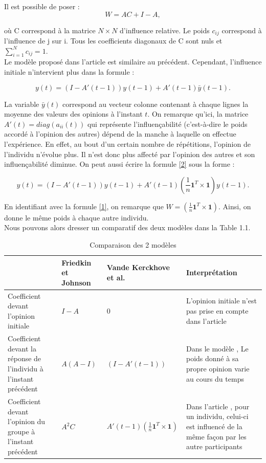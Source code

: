 \documentclass{scrreprt}
\begin{document}
 Il est possible de poser :\\
\begin{equation}
\label{WC}
 W=AC+I-A,
\end{equation}

\noindent où C correspond à la matrice $N \times N$ d'influence relative. Le poids $c_{ij}$ correspond à l'influence de j sur i. Tous les coefficients diagonaux de C sont nuls et $\sum_{i=1}^{N} c_{ij} = 1$. \\

Le modèle proposé dans l'article \cite{VMG} est similaire au précédent. Cependant, l’influence initiale n'intervient plus dans la formule :

\begin{equation}
\label{2}
y(t) =(I-A'(t-1))y(t-1)+A'(t-1)\bar{y}(t-1).
\end{equation}

La variable $\bar{y}(t)$ correspond au vecteur colonne contenant à chaque lignes la moyenne des valeurs des opinions à l'instant $t$. On remarque qu’ici, la matrice $A'(t) = diag(a_{ii}(t))$ qui représente l'influençabilité (c'est-à-dire le poids accordé à l'opinion des autres) dépend de la manche à laquelle on effectue l’expérience. En effet, au bout d'un certain nombre de répétitions, l'opinion de l'individu n'évolue plus. Il n'est donc plus affecté par l'opinion des autres et son influençabilité diminue. On peut aussi écrire la formule \eqref{2} sous la forme :

\begin{dmath}
\label{3}
y(t) = (I-A'(t-1))y(t-1) + A'(t-1)(\frac{1}{n} \textbf{1} ^T\times \textbf{1}) y(t-1).
\end{dmath}

En identifiant avec la formule \eqref{1}, on remarque que $W=(\frac{1}{n} \textbf{1} ^T\times \textbf{1})$. Ainsi, on donne le même poids à chaque autre individu.\\

Nous pouvons alors dresser un comparatif des deux modèles dans la Table 1.1.\\

  

\begin{table}
	\begin{tabular}{|p{3cm}|p{3.375cm}|p{3.375cm}|p{3.375cm}|}
		\hline
 & Friedkin et Johnson \cite{FJ} & Vande Kerckhove et al. \cite{VMG} & Interprétation \tabularnewline
		\hline
Coefficient devant l'opinion initiale & $I-A$ & $0$ & L'opinion initiale n'est pas prise en compte dans l'article \cite{VMG} \tabularnewline
		\hline
Coefficient devant la réponse de l'individu à l'instant précédent & $A(A-I)$ & $(I-A'(t-1))$ & Dans le modèle  \cite{VMG}, Le poids donné à sa propre opinion varie au cours du temps \tabularnewline
		\hline
Coefficient devant l'opinion du groupe à l'instant précédent & $A^{2}C$ & $A'(t-1)(\frac{1}{n} \textbf{1} ^T\times \textbf{1})$ & Dans l'article \cite{VMG}, pour un individu, celui-ci est influencé de la même façon par les autre participants \tabularnewline
		\hline
	\end{tabular}
	\caption{Comparaison des 2 modèles}
\end{table}
\end{document}
